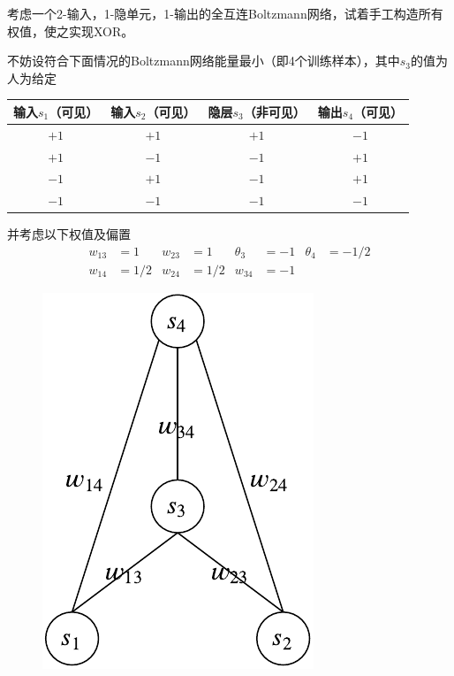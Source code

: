 \documentclass[reportComp]{thesis}
\begin{document}
\begin{question}[\textsection 7 Q10]
考虑一个2-输入，1-隐单元，1-输出的全互连Boltzmann网络，试着手工构造所有权值，使之实现XOR。
\end{question}
\begin{answer}
不妨设符合下面情况的Boltzmann网络能量最小（即4个训练样本），其中$s_3$的值为人为给定
\begin{center}
\begin{tabular}{cc|c|c}\hline
输入$s_1$（可见） & 输入$s_2$（可见） & 隐层$s_3$（非可见） & 输出$s_4$（可见）\\\hline
 $+1$ & $+1$ & $+1$ & $-1$\\
 $+1$ & $-1$ & $-1$ & $+1$\\
 $-1$ & $+1$ & $-1$ & $+1$\\
 $-1$ & $-1$ & $-1$ & $-1$\\\hline
\end{tabular}
\end{center}
并考虑以下权值及偏置
\[\begin{array}{llllllll}
w_{13} &= 1 & w_{23} &=1 &\theta_{3} &= -1 & \theta_{4} &=-1/2\\
w_{14} &= 1/2 & w_{24} &=1/2 & w_{34} &=-1
\end{array}\]
\begin{figure}[H]
\centering
\includegraphics[width=0.25\linewidth]{fig/Q10.pdf}
\end{figure}


\end{answer}
\end{document}
